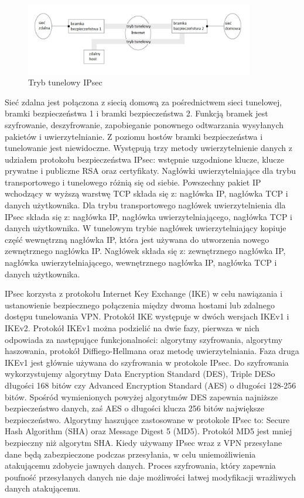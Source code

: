 \documentclass[12p]{article}
\begin{document}
\begin{figure}[H]
\centering
\includegraphics[width=10cm]{tryb_tunelowy_IPsec.jpg}
\caption{Tryb tunelowy IPsec}\label{IPsec}
\end{figure}
 
\quad Sieć zdalna jest połączona z siecią domową za pośrednictwem sieci tunelowej, bramki bezpieczeństwa 1 i bramki bezpieczeństwa 2. Funkcją bramek jest szyfrowanie, deszyfrowanie, zapobieganie ponownego odtwarzania wysyłanych pakietów i uwierzytelnianie. Z poziomu hostów bramki bezpieczeństwa i tunelowanie jest niewidoczne. Występują trzy metody uwierzytelnienie danych z udziałem protokołu bezpieczeństwa IPsec: wstępnie uzgodnione klucze, klucze prywatne i publiczne RSA oraz certyfikaty. Nagłówki uwierzytelniające dla trybu transportowego i tunelowego różnią się od siebie. Powszechny pakiet IP wchodzący w wyższą warstwę TCP składa się z: nagłówka IP, nagłówka TCP i danych użytkownika. Dla trybu transportowego nagłówek uwierzytelnienia dla IPsec składa się z: nagłówka IP, nagłówka uwierzytelniającego, nagłówka TCP i danych użytkownika. W tunelowym trybie nagłówek uwierzytelniający kopiuje część wewnętrzną nagłówka IP, która jest używana do utworzenia nowego zewnętrznego nagłówka IP. Nagłówek składa się z: zewnętrznego nagłówka IP, nagłówka uwierzytelniającego, wewnętrznego nagłówka IP, nagłówka TCP i danych użytkownika.

IPsec korzysta z protokołu Internet Key Exchange (IKE) w celu nawiązania i ustanowienie bezpiecznego połączenia między dwoma hostami lub zdalnego dostępu tunelowania VPN. Protokół IKE występuje w dwóch wersjach IKEv1 i IKEv2. Protokół IKEv1 można podzielić na dwie fazy, pierwsza w nich odpowiada za następujące funkcjonalności: algorytmy szyfrowania, algorytmy haszowania, protokół Diffiego-Hellmana oraz metodę uwierzytelniania.  Faza druga IKEv1 jest głównie używana do szyfrowania w protokole IPsec. Do szyfrowania wykorzystujemy algorytmy Data Encryption Standard (DES),  Triple DESo długości 168 bitów czy Advanced Encryption Standard (AES) o długości 128-256 bitów. Spośród wymienionych powyżej algorytmów DES zapewnia najniższe bezpieczeństwo danych, zaś AES o długości klucza 256 bitów największe bezpieczeństwo. Algorytmy haszujące zastosowane w protokole IPsec to: Secure Hash Algorithm (SHA) oraz Message Digest 5 (MD5). Protokół MD5 jest mniej bezpieczny niż algorytm SHA.
Kiedy używamy IPsec wraz z VPN przesyłane dane będą zabezpieczone podczas przesyłania, w celu uniemożliwienia atakującemu zdobycie jawnych danych.  Proces szyfrowania, który zapewnia poufność przesyłanych danych nie daje możliwości łatwej modyfikacji wrażliwych danych atakującemu.
\end{document}
